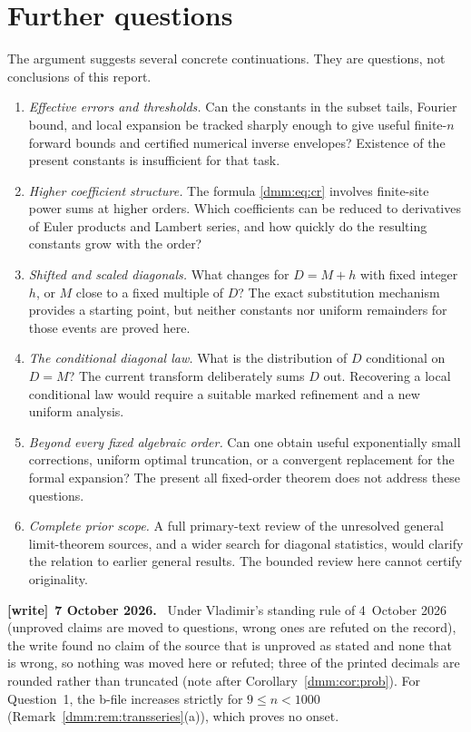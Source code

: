 \documentclass[11pt,letterpaper]{article}
\numberwithin{equation}{section}
\theoremstyle{definition}\newtheorem{definition}[theorem]{Definition}
\theoremstyle{remark}\newtheorem{remark}[theorem]{Remark}
\newenvironment{writenote}[1][]{\par\smallskip\begingroup\small
 \noindent\textbf{[write]}\if\relax\detokenize{#1}\relax\else~\textbf{#1.}\fi\ }%
 {\par\endgroup\smallskip}
\begin{document}
\section{Further questions}\label{dmm:sec:questions}
The argument suggests several concrete continuations. They are questions, not conclusions of this report.
\begin{enumerate}[leftmargin=*,itemsep=5pt]
\item \emph{Effective errors and thresholds.} Can the constants in the subset tails, Fourier bound, and local expansion be tracked sharply enough to give useful finite-$n$ forward bounds and certified numerical inverse envelopes? Existence of the present constants is insufficient for that task.
\item \emph{Higher coefficient structure.} The formula \eqref{dmm:eq:cr} involves finite-site power sums at higher orders. Which coefficients can be reduced to derivatives of Euler products and Lambert series, and how quickly do the resulting constants grow with the order?
\item \emph{Shifted and scaled diagonals.} What changes for $D=M+h$ with fixed integer $h$, or $M$ close to a fixed multiple of $D$? The exact substitution mechanism provides a starting point, but neither constants nor uniform remainders for those events are proved here.
\item \emph{The conditional diagonal law.} What is the distribution of $D$ conditional on $D=M$? The current transform deliberately sums $D$ out. Recovering a local conditional law would require a suitable marked refinement and a new uniform analysis.
\item \emph{Beyond every fixed algebraic order.} Can one obtain useful exponentially small corrections, uniform optimal truncation, or a convergent replacement for the formal expansion? The present all fixed-order theorem does not address these questions.
\item \emph{Complete prior scope.} A full primary-text review of the unresolved general limit-theorem sources, and a wider search for diagonal statistics, would clarify the relation to earlier general results. The bounded review here cannot certify originality.
\end{enumerate}
\begin{writenote}[7 October 2026]
Under Vladimir's standing rule of 4~October 2026 (unproved claims are moved
to questions, wrong ones are refuted on the record), the write found no claim
of the source that is unproved as stated and none that is wrong, so nothing
was moved here or refuted; three of the printed decimals are rounded rather
than truncated (note after Corollary~\ref{dmm:cor:prob}). For Question~1, the
b-file increases strictly for $9\le n<1000$ (Remark~\ref{dmm:rem:transseries}(a)),
which proves no onset.
\end{writenote}
\end{document}
